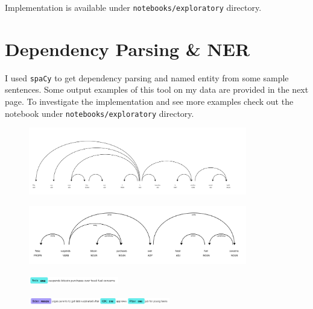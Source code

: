 \documentclass[11pt]{article}
\begin{document}
Implementation is available under \texttt{notebooks/exploratory} directory.

\section{Dependency Parsing \& NER}
I used \texttt{spaCy} to get dependency parsing and named entity from some sample sentences. Some output examples of this tool on my data are provided in the next page. To investigate the implementation and see more examples check out the notebook under \texttt{notebooks/exploratory} directory.

\newpage

\begin{center}
  \begin{figure}[h!]
    \includegraphics[width=0.85\textwidth]{figs/dep_ner/dep_2.png}
  \end{figure}
\end{center}

\begin{center}
  \begin{figure}[h!]
    \includegraphics[width=0.85\textwidth]{figs/dep_ner/dep_1.png}
  \end{figure}
  \end{center}

\begin{center}
  \begin{figure}[h!]
    \includegraphics[width=0.35\textwidth]{figs/dep_ner/ner_1.png}
  \end{figure}
\end{center}

\begin{center}
  \begin{figure}[h!]
    \includegraphics[width=0.55\textwidth]{figs/dep_ner/ner_3.png}
  \end{figure}
\end{center}
\end{document}
